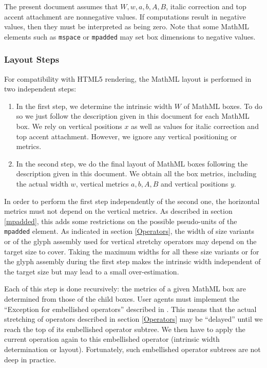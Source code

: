 The present document assumes that $W,w,a,b,A,B$, italic correction
and top accent attachment are nonnegative values. If computations result
in negative values, then they must be interpreted as being zero.
Note that some MathML elements such as {\tt mspace} or {\tt mpadded} may set box
dimensions to negative values.

\subsubsection{Layout Steps}\label{LayoutSteps}

For compatibility with HTML5 rendering, the MathML layout is performed in two
independent steps:

\begin{enumerate}
\item In the first step, we determine the intrinsic width $W$ of MathML boxes.
  To do so we just follow the description given in this document for each
  MathML box. We rely on vertical positions $x$ as well as values for
  italic correction and top accent attachment. However, we ignore any vertical
  positioning or metrics.
\item In the second step, we do the final layout of MathML boxes following
  the description given in this document. We obtain all the box metrics,
  including the actual width $w$, vertical metrics $a,b,A,B$ and
  vertical positions $y$.
\end{enumerate}

In order to perform the first step independently of the second one, the
horizontal metrics must not depend on the vertical metrics. As described in
section \ref{mpadded}, this adds some restrictions on the possible pseudo-units
of the {\tt mpadded} element. As indicated in section \ref{Operators},
the width of size variants or of the glyph assembly used for vertical stretchy
operators may depend on the target size to cover. Taking the maximum widths
for all these size variants or for the glyph assembly during the first step
makes the intrinsic width independent of the target size but may lead to a
small over-estimation.

Each of this step is done recursively: the metrics of a given MathML box
are determined from those of the child boxes. User agents must implement
the ``Exception for embellished operators'' described in \cite{MathML3}.
This means that the actual stretching of operators described in section
\ref{Operators} may be ``delayed'' until we reach the top of its embellished
operator subtree. We then have to apply the current operation again
to this embellished operator (intrinsic width determination or layout).
Fortunately, such embellished operator subtrees are not deep in practice.

